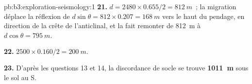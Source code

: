 \begin{solution}{pb:b3:exploration-seismology:1}
\textbf{21.} $d = 2480\times0.655/2 = \qty{812}{m}$~; la migration déplace la
réflexion de $d\sin\theta = 812\times0.207 = \qty{168}{m}$ vers le haut du
pendage, en direction de la crête de l'anticlinal, et la fait remonter de \qty{812}{m} à $d\cos\theta =
\qty{795}{m}$.

\textbf{22.} $2500\times0.160/2 = \qty{200}{m}$.

\textbf{23.} D'après les questions 13 et 14, la discordance de socle se trouve
\textbf{\qty[text-series-to-math=true]{1011}{m}} sous le sol au  S.
\end{solution}
